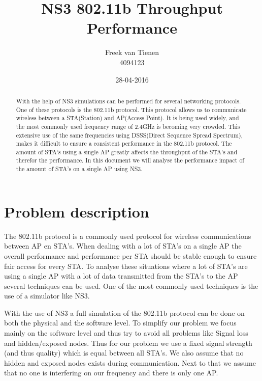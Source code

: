 \documentclass[]{article}
\begin{document}


\title{NS3 802.11b Throughput Performance}
\author{Freek van Tienen \\ 4094123}
\date{28-04-2016}
\maketitle

\begin{abstract}
With the help of NS3 simulations can be performed for several networking protocols.
One of these protocols is the 802.11b protocol.
This protocol allows us to communicate wireless between a STA(Station) and AP(Access Point).
It is being used widely, and the most commonly used frequency range of 2.4GHz is becoming very crowded.
This extensive use of the same frequencies using DSSS(Direct Sequence Spread Spectrum), makes it difficult to ensure a consistent performance in the 802.11b protocol.
The amount of STA's using a single AP greatly affects the throughput of the STA's and therefor the performance.
In this document we will analyse the performance impact of the amount of STA's on a single AP using NS3.
\end{abstract}


\section{Problem description}
The 802.11b protocol is a commonly used protocol for wireless communications between AP en STA's.
When dealing with a lot of STA's on a single AP the overall performance and performance per STA should be stable enough to ensure fair access for every STA.
To analyse these situations where a lot of STA's are using a single AP with a lot of data transmitted from the STA's to the AP several techniques can be used.
One of the most commonly used techniques is the use of a simulator like NS3.

With the use of NS3 a full simulation of the 802.11b protocol can be done on both the physical and the software level.
To simplify our problem we focus mainly on the software level and thus try to avoid all problems like Signal loss and hidden/exposed nodes.
Thus for our problem we use a fixed signal strength (and thus quality) which is equal between all STA's.
We also assume that no hidden and exposed nodes exists during communication.
Next to that we assume that no one is interfering on our frequency and there is only one AP.
\end{document}
